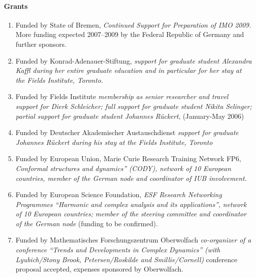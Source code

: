 \paragraph{Grants}
\begin{enumerate}
\item Funded by State of Bremen, \emph{Continued Support for
Preparation of IMO 2009.} More funding expected 2007--2009 by the
Federal Republic of Germany and further sponsors. \item Funded by
Konrad-Adenauer-Stiftung, \emph{ support for graduate student
Alexandra Kaffl during her entire graduate education and in
particular for her stay at the Fields Institute, Toronto.} \item
Funded by Fields Institute \emph{membership as senior researcher
and travel support for Dierk Schleicher; full support for graduate
student Nikita Selinger; partial support for graduate student
Johannes R\"uckert}, (January-May 2006) \item Funded by Deutscher
Akademischer Austauschdienst \emph{support for graduate Johannes
R\"uckert during his stay at the Fields Institute, Toronto} \item
Funded by European Union, Marie Curie Research Training Network
FP6, \emph{Conformal structures and dynamics'' (CODY), network of
10 European countries, member of the German node and coordinator
of IUB involvement.} \item Funded by European Science Foundation,
\emph{ESF Research Networking Programmes ``Harmonic and complex
analysis and its applications'', network of 10 European countries;
member of the steering committee and coordinator of the German
node} (funding to be confirmed). \item Funded by Mathematisches
Forschungszentrum Oberwolfach \emph{co-organizer of a conference
``Trends and Developments in Complex Dynamics'' (with
Lyubich/Stony Brook, Petersen/Roskilde and Smillie/Cornell)}
conference proposal accepted, expenses sponsored by Oberwolfach.
\end{enumerate}

